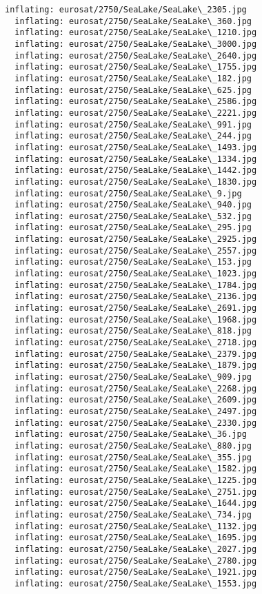 \documentclass[11pt]{article}
\begin{document}
\begin{Verbatim}[commandchars=\\\{\}]
  inflating: eurosat/2750/SeaLake/SeaLake\_2305.jpg
  inflating: eurosat/2750/SeaLake/SeaLake\_360.jpg
  inflating: eurosat/2750/SeaLake/SeaLake\_1210.jpg
  inflating: eurosat/2750/SeaLake/SeaLake\_3000.jpg
  inflating: eurosat/2750/SeaLake/SeaLake\_2640.jpg
  inflating: eurosat/2750/SeaLake/SeaLake\_1755.jpg
  inflating: eurosat/2750/SeaLake/SeaLake\_182.jpg
  inflating: eurosat/2750/SeaLake/SeaLake\_625.jpg
  inflating: eurosat/2750/SeaLake/SeaLake\_2586.jpg
  inflating: eurosat/2750/SeaLake/SeaLake\_2221.jpg
  inflating: eurosat/2750/SeaLake/SeaLake\_991.jpg
  inflating: eurosat/2750/SeaLake/SeaLake\_244.jpg
  inflating: eurosat/2750/SeaLake/SeaLake\_1493.jpg
  inflating: eurosat/2750/SeaLake/SeaLake\_1334.jpg
  inflating: eurosat/2750/SeaLake/SeaLake\_1442.jpg
  inflating: eurosat/2750/SeaLake/SeaLake\_1830.jpg
  inflating: eurosat/2750/SeaLake/SeaLake\_9.jpg
  inflating: eurosat/2750/SeaLake/SeaLake\_940.jpg
  inflating: eurosat/2750/SeaLake/SeaLake\_532.jpg
  inflating: eurosat/2750/SeaLake/SeaLake\_295.jpg
  inflating: eurosat/2750/SeaLake/SeaLake\_2925.jpg
  inflating: eurosat/2750/SeaLake/SeaLake\_2557.jpg
  inflating: eurosat/2750/SeaLake/SeaLake\_153.jpg
  inflating: eurosat/2750/SeaLake/SeaLake\_1023.jpg
  inflating: eurosat/2750/SeaLake/SeaLake\_1784.jpg
  inflating: eurosat/2750/SeaLake/SeaLake\_2136.jpg
  inflating: eurosat/2750/SeaLake/SeaLake\_2691.jpg
  inflating: eurosat/2750/SeaLake/SeaLake\_1968.jpg
  inflating: eurosat/2750/SeaLake/SeaLake\_818.jpg
  inflating: eurosat/2750/SeaLake/SeaLake\_2718.jpg
  inflating: eurosat/2750/SeaLake/SeaLake\_2379.jpg
  inflating: eurosat/2750/SeaLake/SeaLake\_1879.jpg
  inflating: eurosat/2750/SeaLake/SeaLake\_909.jpg
  inflating: eurosat/2750/SeaLake/SeaLake\_2268.jpg
  inflating: eurosat/2750/SeaLake/SeaLake\_2609.jpg
  inflating: eurosat/2750/SeaLake/SeaLake\_2497.jpg
  inflating: eurosat/2750/SeaLake/SeaLake\_2330.jpg
  inflating: eurosat/2750/SeaLake/SeaLake\_36.jpg
  inflating: eurosat/2750/SeaLake/SeaLake\_880.jpg
  inflating: eurosat/2750/SeaLake/SeaLake\_355.jpg
  inflating: eurosat/2750/SeaLake/SeaLake\_1582.jpg
  inflating: eurosat/2750/SeaLake/SeaLake\_1225.jpg
  inflating: eurosat/2750/SeaLake/SeaLake\_2751.jpg
  inflating: eurosat/2750/SeaLake/SeaLake\_1644.jpg
  inflating: eurosat/2750/SeaLake/SeaLake\_734.jpg
  inflating: eurosat/2750/SeaLake/SeaLake\_1132.jpg
  inflating: eurosat/2750/SeaLake/SeaLake\_1695.jpg
  inflating: eurosat/2750/SeaLake/SeaLake\_2027.jpg
  inflating: eurosat/2750/SeaLake/SeaLake\_2780.jpg
  inflating: eurosat/2750/SeaLake/SeaLake\_1921.jpg
  inflating: eurosat/2750/SeaLake/SeaLake\_1553.jpg

\end{Verbatim}
\end{document}
